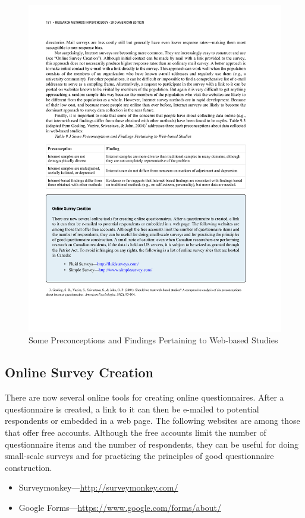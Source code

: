 \begin{figure}




\includegraphics[width=\linewidth]{figures/C9online.pdf}




\caption{Some Preconceptions and Findings Pertaining to Web-based Studies}




\label{fig:online}




\end{figure}

\subsection{Online Survey Creation}

There are now several online tools for creating online questionnaires. After a questionnaire is created, a link to it can then be e-mailed to potential respondents or embedded in a web page. The following websites are among those that offer free accounts. Although the free accounts limit the number of questionnaire items and the number of respondents, they can be useful for doing small-scale surveys and for practicing the principles of good questionnaire construction.
\begin{itemize}
\item Surveymonkey---\url{http://surveymonkey.com/}
\item Google Forms---\url{https://www.google.com/forms/about/}
\end{itemize}


